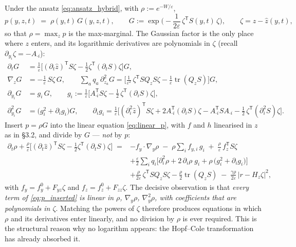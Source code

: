 \documentclass[11pt,a4paper]{article}
\newcommand{\tr}{\operatorname{tr}}
\newcommand{\T}{^{\mathsf T}}
\newcommand{\zh}{\hat{z}}
\newcommand{\eps}{\varepsilon}
\newcommand{\abs}[1]{\left\lvert #1 \right\rvert}
\newcommand{\gy}{\nabla_{\!y}}
\newcommand{\gz}{\nabla_{\!z}}
\newcommand{\Hy}{\nabla_{\!y}^2}
\theoremstyle{plain}
\theoremstyle{definition}
\theoremstyle{remark}
\begin{document}
Under the ansatz \eqref{eq:ansatz_hybrid}, with $\rho := e^{-W/\eps}$,
\begin{equation}
  p(y,z,t) \;=\; \rho(y,t)\,G(y,z,t), \qquad
  G := \exp\Big(-\frac{1}{2\eps}\,\zeta\T S(y,t)\,\zeta\Big), \qquad \zeta = z-\zh(y,t),
  \label{eq:p_ansatz}
\end{equation}
so that $\rho=\max_z p$ is the max-marginal. The Gaussian factor is the only place where $z$ enters, and its logarithmic derivatives are polynomials in $\zeta$ (recall $\partial_{y_i}\zeta = -A_{\cdot i}$):
\begin{align*}
  \partial_t G &= \frac{1}{\eps}\Big[(\partial_t\zh)\T S\zeta - \tfrac12\zeta\T(\partial_tS)\zeta\Big]G, \\
  \gz G &= -\frac{1}{\eps}\,S\zeta\,G, \qquad
  \sum_a q_a\,\partial_{z_a}^2 G = \Big[\frac{1}{\eps^2}\,\zeta\T SQ_zS\zeta - \frac1\eps\tr(Q_zS)\Big]G, \\
  \partial_{y_i}G &= g_i\,G, \qquad g_i := \frac{1}{\eps}\Big[A_{\cdot i}\T S\zeta - \tfrac12\,\zeta\T(\partial_iS)\zeta\Big], \\
  \partial_{y_i}^2 G &= \big(g_i^2 + \partial_ig_i\big)G, \qquad
  \partial_i g_i = \frac{1}{\eps}\Big[(\partial_i^2\zh)\T S\zeta + 2A_{\cdot i}\T(\partial_iS)\zeta - A_{\cdot i}\T SA_{\cdot i} - \tfrac12\,\zeta\T(\partial_i^2S)\zeta\Big].
\end{align*}
Insert $p=\rho G$ into the linear equation \eqref{eq:linear_p}, with $f$ and $h$ linearised in $z$ as in \S3.2, and divide by $G$ --- \emph{not} by $p$:
\begin{equation}
\begin{aligned}
  \partial_t\rho + \frac{\rho}{\eps}\Big[(\partial_t\zh)\T S\zeta - \tfrac12\zeta\T(\partial_tS)\zeta\Big]
  \;={}& -f_y\cdot\gy\rho \;-\; \rho\sum_i f_{y,i}\,g_i \;+\; \frac{\rho}{\eps}\,f_z\T S\zeta \\
  &+ \frac{\eps}{2}\sum_i q_i\Big[\partial_i^2\rho + 2\,\partial_i\rho\; g_i + \rho\,\big(g_i^2+\partial_ig_i\big)\Big] \\
  &+ \frac{\rho}{2\eps}\,\zeta\T SQ_zS\zeta - \frac{\rho}{2}\tr(Q_zS) \;-\; \frac{\gamma\rho}{2\eps}\,\abs{r-H_z\zeta}^2 ,
\end{aligned}
\label{eq:p_inserted}
\end{equation}
with $f_y = f_y^0 + F_{yz}\zeta$ and $f_z = f_z^0 + F_{zz}\zeta$. The decisive observation is that \emph{every term of \eqref{eq:p_inserted} is linear in $\rho$, $\gy\rho$, $\Hy\rho$, with coefficients that are polynomials in $\zeta$}. Matching the powers of $\zeta$ therefore produces equations in which $\rho$ and its derivatives enter linearly, and no division by $\rho$ is ever required. This is the structural reason why no logarithm appears: the Hopf--Cole transformation has already absorbed it.
\end{document}
